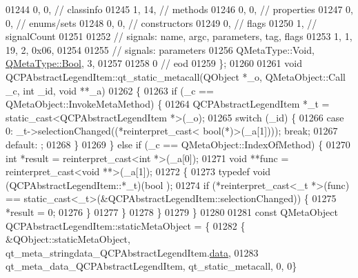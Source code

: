\begin{DoxyCode}
01244        0,    0, \textcolor{comment}{// classinfo}
01245        1,   14, \textcolor{comment}{// methods}
01246        0,    0, \textcolor{comment}{// properties}
01247        0,    0, \textcolor{comment}{// enums/sets}
01248        0,    0, \textcolor{comment}{// constructors}
01249        0,       \textcolor{comment}{// flags}
01250        1,       \textcolor{comment}{// signalCount}
01251 
01252  \textcolor{comment}{// signals: name, argc, parameters, tag, flags}
01253        1,    1,   19,    2, 0x06,
01254 
01255  \textcolor{comment}{// signals: parameters}
01256     QMetaType::Void, \hyperlink{a00001_a76a8b016e5ad61faf9062cc387df5016}{QMetaType::Bool},    3,
01257 
01258        0        \textcolor{comment}{// eod}
01259 \};
01260 
01261 \textcolor{keywordtype}{void} QCPAbstractLegendItem::qt\_static\_metacall(QObject *\_o, QMetaObject::Call \_c, \textcolor{keywordtype}{int} \_id, \textcolor{keywordtype}{void} **\_a)
01262 \{
01263     \textcolor{keywordflow}{if} (\_c == QMetaObject::InvokeMetaMethod) \{
01264         QCPAbstractLegendItem *\_t = \textcolor{keyword}{static\_cast<}QCPAbstractLegendItem *\textcolor{keyword}{>}(\_o);
01265         \textcolor{keywordflow}{switch} (\_id) \{
01266         \textcolor{keywordflow}{case} 0: \_t->selectionChanged((*\textcolor{keyword}{reinterpret\_cast<} \textcolor{keywordtype}{bool}(*)\textcolor{keyword}{>}(\_a[1]))); \textcolor{keywordflow}{break};
01267         \textcolor{keywordflow}{default}: ;
01268         \}
01269     \} \textcolor{keywordflow}{else} \textcolor{keywordflow}{if} (\_c == QMetaObject::IndexOfMethod) \{
01270         \textcolor{keywordtype}{int} *result = \textcolor{keyword}{reinterpret\_cast<}\textcolor{keywordtype}{int} *\textcolor{keyword}{>}(\_a[0]);
01271         \textcolor{keywordtype}{void} **func = \textcolor{keyword}{reinterpret\_cast<}\textcolor{keywordtype}{void} **\textcolor{keyword}{>}(\_a[1]);
01272         \{
01273             \textcolor{keyword}{typedef} void (QCPAbstractLegendItem::*\_t)(bool );
01274             \textcolor{keywordflow}{if} (*reinterpret\_cast<\_t *>(func) == \textcolor{keyword}{static\_cast<}\_t\textcolor{keyword}{>}(&QCPAbstractLegendItem::selectionChanged))
       \{
01275                 *result = 0;
01276             \}
01277         \}
01278     \}
01279 \}
01280 
01281 \textcolor{keyword}{const} QMetaObject QCPAbstractLegendItem::staticMetaObject = \{
01282     \{ &QObject::staticMetaObject, qt\_meta\_stringdata\_QCPAbstractLegendItem.\hyperlink{a00016_a98fcd80c37c93a0b0b71f18405466d42}{data},
01283       qt\_meta\_data\_QCPAbstractLegendItem,  qt\_static\_metacall, 0, 0\}

\end{DoxyCode}
